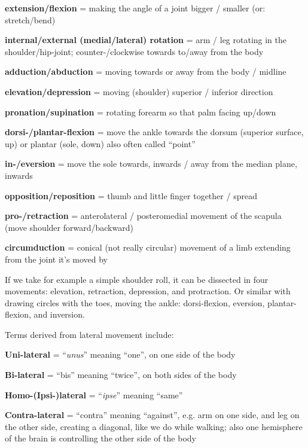 \begin{itemize*}
    \item \textbf{extension/flexion} = making the angle of a joint bigger / smaller (or: stretch/bend)
    \item \textbf{internal/external (medial/lateral) rotation} = arm / leg rotating in the shoulder/hip-joint; counter-/clockwise towards to/away from the body
    \item \textbf{adduction/abduction} = moving towards or away from the body / midline
    \item \textbf{elevation/depression} = moving (shoulder) superior / inferior direction
    \item \textbf{pronation/supination} = rotating forearm so that palm facing up/down
    \item \textbf{dorsi-/plantar-flexion} = move the ankle towards the dorsum (superior surface, up) or plantar (sole, down) also often called ``point''
    \item \textbf{in-/eversion} = move the sole towards, inwards / away from the median plane, inwards
    \item \textbf{opposition/reposition} = thumb and little finger together / spread
    \item \textbf{pro-/retraction} = anterolateral / posteromedial movement of the scapula (move shoulder forward/backward)
    \item \textbf{circumduction} = conical (not really circular) movement of a limb extending from the joint it's moved by
\end{itemize*}

If we take for example a simple shoulder roll, it can be dissected in four movements: elevation, retraction, depression, and protraction.
Or similar with drawing circles with the toes, moving the ankle: dorsi-flexion, eversion, plantar-flexion, and inversion.

Terms derived from lateral movement include:

\begin{itemize*}
    \item \textbf{Uni-lateral} = ``\textit{unus}'' meaning ``one'', on one side of the body
    \item \textbf{Bi-lateral} = ``bis'' meaning ``twice'', on both sides of the body
    \item \textbf{Homo-(Ipsi-)lateral} = ``\textit{ipse}'' meaning ``same''
    \item \textbf{Contra-lateral} = ``contra'' meaning ``against'', e.g. arm on one side, and leg on the other side, creating a diagonal, like we do while walking; also one hemisphere of the brain is controlling the other side of the body
\end{itemize*}

